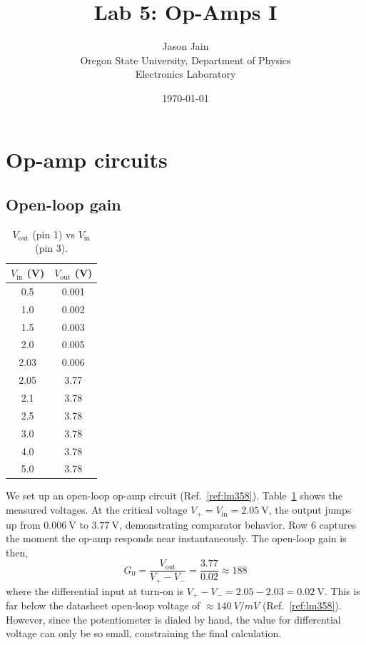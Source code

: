 \documentclass[11pt]{article}
\title{Lab 5: Op-Amps I}
\author{Jason Jain \\
        Oregon State University, Department of Physics \\
        Electronics Laboratory}
\date{\today}
\begin{document}
\maketitle

\section{Op-amp circuits}

\subsection{Open-loop gain}

\begin{table}[H]
  \centering
  \begin{tabular}{cc}
    \hline
    $V_\mathrm{in}$ (\unit{\volt}) & $V_\mathrm{out}$ (\unit{\volt}) \\
    \hline
    0.5                            & 0.001                           \\
    1.0                            & 0.002                           \\
    1.5                            & 0.003                           \\
    2.0                            & 0.005                           \\
    2.03                           & 0.006                           \\
    2.05                           & 3.77                            \\
    2.1                            & 3.78                            \\
    2.5                            & 3.78                            \\
    3.0                            & 3.78                            \\
    4.0                            & 3.78                            \\
    5.0                            & 3.78                            \\
    \hline
  \end{tabular}
  \caption{$V_\mathrm{out}$ (pin 1) vs $V_\mathrm{in}$ (pin 3).}
  \label{tab:part1a}
\end{table}


We set up an open-loop op-amp circuit (Ref.~\ref{ref:lm358}). Table~\ref{tab:part1a} shows the measured voltages. At the critical voltage $V_+=V_\mathrm{in} = \qty{2.05}{\volt}$, the output jumps up from $\qty{0.006}{\volt}$ to $\qty{3.77}{\volt}$, demonstrating comparator behavior. Row 6 captures the moment the op-amp responds near instantaneously. The open-loop gain is then,
$$
  G_0 = \frac{V_\mathrm{out}}{V_+ - V_-} = \frac{3.77}{0.02} \approx 188
$$
where the differential input at turn-on is $V_+ - V_- = 2.05 - 2.03 = \qty{0.02}{\volt}$. This is far below the datasheet open-loop voltage of $\approx\qty{140}{V/mV}$ (Ref.~\ref{ref:lm358}). However, since the potentiometer is dialed by hand, the value for differential voltage can only be so small, constraining the final calculation.
\end{document}
